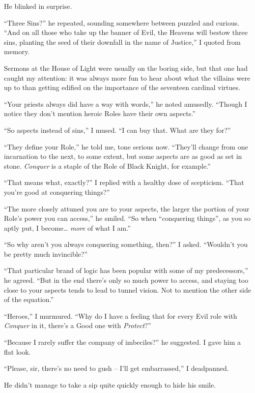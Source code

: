 \documentclass[12pt, openany]{book}
\begin{document}
He blinked in surprise.

“Three Sins?” he repeated, sounding somewhere between puzzled and curious.
“And on all those who take up the banner of Evil, the Heavens will bestow three sins, planting the seed of their downfall in the name of Justice,” I quoted from memory.

Sermons at the House of Light were usually on the boring side, but that one had caught my attention: it was always more fun to hear about what the villains were up to than getting edified on the importance of the seventeen cardinal virtues.

“Your priests always did have a way with words,” he noted amusedly. “Though I notice they don’t mention heroic Roles have their own aspects.”

“So aspects instead of sins,” I mused. “I can buy that. What are they for?”

“They define your Role,” he told me, tone serious now. “They’ll change from one incarnation to the next, to some extent, but some aspects are as good as set in stone. \textit{Conquer }is a staple of the Role of Black Knight, for example.”

“That means what, exactly?” I replied with a healthy dose of scepticism. “That you’re good at conquering things?”

“The more closely attuned you are to your aspects, the larger the portion of your Role’s power you can access,” he smiled. “So when “conquering things”, as you so aptly put, I become… \textit{more} of what I am.”

“So why aren’t you always conquering something, then?” I asked. “Wouldn’t you be pretty much invincible?”

“That particular brand of logic has been popular with some of my predecessors,” he agreed. “But in the end there’s only so much power to access, and staying too close to your aspects tends to lead to tunnel vision. Not to mention the other side of the equation.”

“Heroes,” I murmured. “Why do I have a feeling that for every Evil role with \textit{Conquer} in it, there’s a Good one with \textit{Protect}?”

“Because I rarely suffer the company of imbeciles?” he suggested.
I gave him a flat look.

“Please, sir, there’s no need to gush – I’ll get embarrassed,” I deadpanned.

He didn’t manage to take a sip quite quickly enough to hide his smile.
\end{document}
